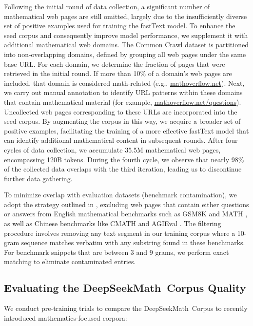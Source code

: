 Following the initial round of data collection, a significant number of mathematical web pages are still omitted, largely due to the insufficiently diverse set of positive examples used for training the fastText model. To enhance the seed corpus and consequently improve model performance, we supplement it with additional mathematical web domains. The Common Crawl dataset is partitioned into non-overlapping domains, defined by grouping all web pages under the same base URL. For each domain, we determine the fraction of pages that were retrieved in the initial round. If more than 10\% of a domain’s web pages are included, that domain is considered math-related (e.g., \url{mathoverflow.net}). Next, we carry out manual annotation to identify URL patterns within these domains that contain mathematical material (for example, \url{mathoverflow.net/questions}). Uncollected web pages corresponding to these URLs are incorporated into the seed corpus. By augmenting the corpus in this way, we acquire a broader set of positive examples, facilitating the training of a more effective fastText model that can identify additional mathematical content in subsequent rounds. After four cycles of data collection, we accumulate 35.5M mathematical web pages, encompassing 120B tokens. During the fourth cycle, we observe that nearly 98\% of the collected data overlaps with the third iteration, leading us to discontinue further data gathering.

To minimize overlap with evaluation datasets (benchmark contamination), we adopt the strategy outlined in \cite{deepseek-coder}, excluding web pages that contain either questions or answers from English mathematical benchmarks such as GSM8K \citep{gsm8k} and MATH \citep{MATH}, as well as Chinese benchmarks like CMATH \citep{wei2023cmath} and AGIEval \citep{agieval}. The filtering procedure involves removing any text segment in our training corpus where a 10-gram sequence matches verbatim with any substring found in these benchmarks. For benchmark snippets that are between 3 and 9 grams, we perform exact matching to eliminate contaminated entries.

\subsection{Evaluating the DeepSeekMath~Corpus Quality}

We conduct pre-training trials to compare the DeepSeekMath~Corpus to recently introduced mathematics-focused corpora:

